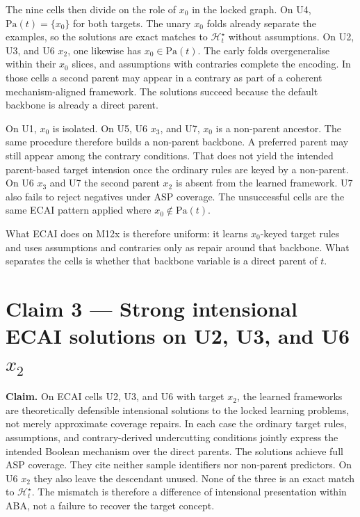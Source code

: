 \documentclass[11pt]{article}
\begin{document}
The nine cells then divide on the role of \(x_0\) in the locked graph. On U4, \(\mathrm{Pa}(t)=\{x_0\}\) for both targets. The unary \(x_0\) folds already separate the examples, so the solutions are exact matches to \(\mathcal{H}_t^\star\) without assumptions. On U2, U3, and U6 \(x_2\), one likewise has \(x_0\in\mathrm{Pa}(t)\). The early folds overgeneralise within their \(x_0\) slices, and assumptions with contraries complete the encoding. In those cells a second parent may appear in a contrary as part of a coherent mechanism-aligned framework. The solutions succeed because the default backbone is already a direct parent.

On U1, \(x_0\) is isolated. On U5, U6 \(x_3\), and U7, \(x_0\) is a non-parent ancestor. The same procedure therefore builds a non-parent backbone. A preferred parent may still appear among the contrary conditions. That does not yield the intended parent-based target intension once the ordinary rules are keyed by a non-parent. On U6 \(x_3\) and U7 the second parent \(x_2\) is absent from the learned framework. U7 also fails to reject negatives under ASP coverage. The unsuccessful cells are the same ECAI pattern applied where \(x_0\notin\mathrm{Pa}(t)\).

What ECAI does on M12x is therefore uniform: it learns \(x_0\)-keyed target rules and uses assumptions and contraries only as repair around that backbone. What separates the cells is whether that backbone variable is a direct parent of \(t\).

\section{Claim 3 --- Strong intensional ECAI solutions on U2, U3, and U6 \(x_2\)}

\textbf{Claim.} On ECAI cells U2, U3, and U6 with target \(x_2\), the learned frameworks are theoretically defensible intensional solutions to the locked learning problems, not merely approximate coverage repairs. In each case the ordinary target rules, assumptions, and contrary-derived undercutting conditions jointly express the intended Boolean mechanism over the direct parents. The solutions achieve full ASP coverage. They cite neither sample identifiers nor non-parent predictors. On U6 \(x_2\) they also leave the descendant unused. None of the three is an exact match to \(\mathcal{H}_t^\star\). The mismatch is therefore a difference of intensional presentation within ABA, not a failure to recover the target concept.
\end{document}

